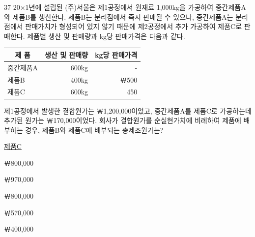 \begin{question}{37}
20×1년에 설립된 (주)서울은 제1공정에서 원재료 1,000kg을 가공하여 중간제품A와 제품B를 생산한다. 제품B는 분리점에서 즉시 판매될 수 있으나, 중간제품A는 분리점에서 판매가치가 형성되어 있지 않기 때문에 제2공정에서 추가 가공하여 제품C로 판매한다. 제품별 생산 및 판매량과 kg당 판매가격은 다음과 같다.

{\small\centering
\begin{tabular}{|l|r|r|}
\hline
\multicolumn{1}{|c|}{제 품} & \multicolumn{1}{c|}{생산 및 판매량} & \multicolumn{1}{c|}{kg당 판매가격} \\
\hline
중간제품A & 600kg & - \\
제품B & 400kg & ￦500 \\
제품C & 600kg & 450 \\
\hline
\end{tabular}\par}

제1공정에서 발생한 결합원가는 ￦1,200,000이었고, 중간제품A를 제품C로 가공하는데 추가된 원가는 ￦170,000이었다. 회사가 결합원가를 순실현가치에 비례하여 제품에 배부하는 경우, 제품B와 제품C에 배부되는 총제조원가는? \par
\noindent\hspace*{2em}\uline{제품C}\par
\begin{choices}
  \item {}￦800,000
  \item {}￦970,000
  \item {}￦800,000
  \item {}￦570,000
  \item {}￦400,000
\end{choices}
\end{question}
